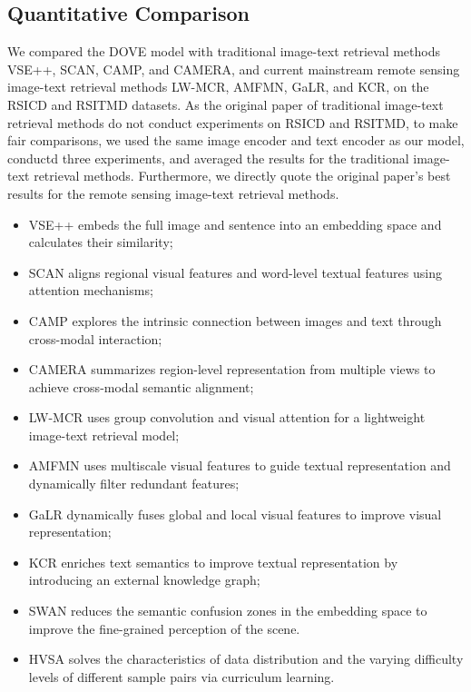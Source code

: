 \documentclass[journal]{IEEEtran}
\begin{document}
\subsection{Quantitative Comparison}
We compared the DOVE model with traditional image-text retrieval methods VSE++, SCAN, CAMP, and CAMERA, and current mainstream remote sensing image-text retrieval methods LW-MCR, AMFMN, GaLR, and KCR, on the RSICD and RSITMD datasets. As the original paper of traditional image-text retrieval methods do not conduct experiments on RSICD and RSITMD, to make fair comparisons, we used the same image encoder and text encoder as our model, conductd three experiments, and averaged the results for the traditional image-text retrieval methods. Furthermore, we directly quote the original paper's best results for the remote sensing image-text retrieval methods.
\begin{itemize}
\item VSE++ \cite{faghri2017vse++} embeds the full image and sentence into an embedding space and calculates their similarity;
\item SCAN \cite{lee2018stacked} aligns regional visual features and word-level textual features using attention mechanisms;
\item CAMP \cite{wang2019camp} explores the intrinsic connection between images and text through cross-modal interaction;
\item CAMERA \cite{qu2020context} summarizes region-level representation from multiple views to achieve cross-modal semantic alignment;
\item LW-MCR \cite{yuan2021lightweight} uses group convolution and visual attention for a lightweight image-text retrieval model;
\item AMFMN \cite{yuan2022exploring} uses multiscale visual features to guide textual representation and dynamically filter redundant features;
\item GaLR \cite{yuan2022remote} dynamically fuses global and local visual features to improve visual representation;
\item KCR \cite{mi2022knowledge} enriches text semantics to improve textual representation by introducing an external knowledge graph;
\item SWAN \cite{pan2023reducing} reduces the semantic confusion zones in the embedding space to improve the fine-grained perception of the scene.
\item HVSA \cite{zhang2023hypersphere} solves the characteristics of data distribution and the varying difficulty levels of different sample pairs via curriculum learning.
\end{itemize}
\end{document}
